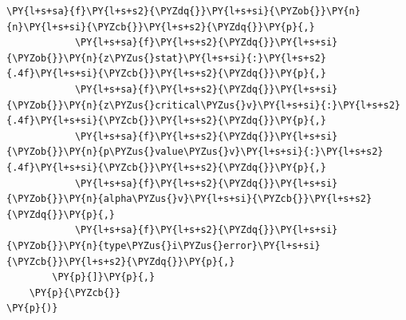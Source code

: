 \begin{tcolorbox}[breakable, size=fbox, boxrule=1pt, pad at break*=1mm,colback=cellbackground, colframe=cellborder]
\begin{Verbatim}[commandchars=\\\{\}]
            \PY{l+s+sa}{f}\PY{l+s+s2}{\PYZdq{}}\PY{l+s+si}{\PYZob{}}\PY{n}{n}\PY{l+s+si}{\PYZcb{}}\PY{l+s+s2}{\PYZdq{}}\PY{p}{,}
            \PY{l+s+sa}{f}\PY{l+s+s2}{\PYZdq{}}\PY{l+s+si}{\PYZob{}}\PY{n}{z\PYZus{}stat}\PY{l+s+si}{:}\PY{l+s+s2}{.4f}\PY{l+s+si}{\PYZcb{}}\PY{l+s+s2}{\PYZdq{}}\PY{p}{,}
            \PY{l+s+sa}{f}\PY{l+s+s2}{\PYZdq{}}\PY{l+s+si}{\PYZob{}}\PY{n}{z\PYZus{}critical\PYZus{}v}\PY{l+s+si}{:}\PY{l+s+s2}{.4f}\PY{l+s+si}{\PYZcb{}}\PY{l+s+s2}{\PYZdq{}}\PY{p}{,}
            \PY{l+s+sa}{f}\PY{l+s+s2}{\PYZdq{}}\PY{l+s+si}{\PYZob{}}\PY{n}{p\PYZus{}value\PYZus{}v}\PY{l+s+si}{:}\PY{l+s+s2}{.4f}\PY{l+s+si}{\PYZcb{}}\PY{l+s+s2}{\PYZdq{}}\PY{p}{,}
            \PY{l+s+sa}{f}\PY{l+s+s2}{\PYZdq{}}\PY{l+s+si}{\PYZob{}}\PY{n}{alpha\PYZus{}v}\PY{l+s+si}{\PYZcb{}}\PY{l+s+s2}{\PYZdq{}}\PY{p}{,}
            \PY{l+s+sa}{f}\PY{l+s+s2}{\PYZdq{}}\PY{l+s+si}{\PYZob{}}\PY{n}{type\PYZus{}i\PYZus{}error}\PY{l+s+si}{\PYZcb{}}\PY{l+s+s2}{\PYZdq{}}\PY{p}{,}
        \PY{p}{]}\PY{p}{,}
    \PY{p}{\PYZcb{}}
\PY{p}{)}
\end{Verbatim}
\end{tcolorbox}


